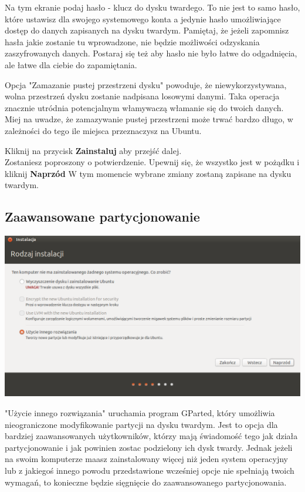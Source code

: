 Na tym ekranie podaj hasło - klucz do dysku twardego. To nie jest to samo hasło, które ustawisz dla swojego systemowego konta a jedynie hasło umożliwiające dostęp do danych zapisanych na dysku twardym. Pamiętaj, że jeżeli zapomnisz hasła jakie zostanie tu wprowadzone, nie będzie możliwości odzyskania zaszyfrowanych danych. Postaraj się też aby hasło nie było łatwe do odgadnięcia, ale łatwe dla ciebie do zapamiętania.

Opcja "Zamazanie pustej przestrzeni dysku" powoduje, że niewykorzystywana, wolna przestrzeń dysku zostanie nadpisana losowymi danymi. Taka operacja znacznie utródnia potencjalnym włamywaczą włamanie się do twoich danych. Miej na uwadze, że zamazywanie pustej przestrzeni może trwać bardzo długo, w zależności do tego ile miejsca przeznaczysz na Ubuntu.

\begin{flushright}
Kliknij na przycisk \textbf{Zainstaluj} aby przejść dalej.\\
Zostaniesz poproszony o potwierdzenie. Upewnij się, że wszystko jest w pożądku i kliknij \textbf{Naprzód}
W tym momencie wybrane zmiany zostaną zapisane na dysku twardym.\\
\end{flushright}
\clearpage

\subsection{Zaawansowane partycjonowanie}
\begin{center}
	\includegraphics[scale=0.5]{images/instalator_partycjonowanie_gparted1.png}
\end{center}
"Użycie innego rozwiązania" uruchamia program GParted, który umożliwia nieograniczone modyfikowanie partycji na dysku twardym. Jest to opcja dla bardziej zaawansowanych użytkowników, którzy mają świadomość tego jak działa partycjonowanie i jak powinien zostac podzielony ich dysk twardy. Jednak jeżeli na swoim komputerze maasz zainstalowany więcej niż jeden system operacyjny lub z jakiegoś innego powodu przedstawione wcześniej opcje nie spełniają twoich wymagań, to konieczne będzie sięgnięcie do zaawansowanego partycjonowania.

